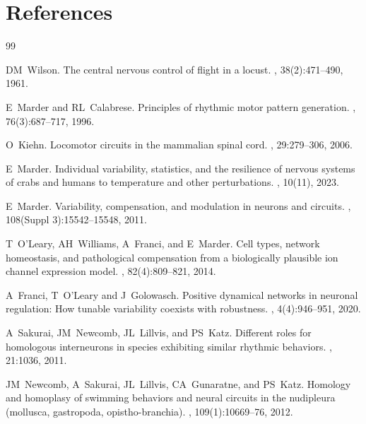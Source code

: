 \documentclass[nofootinbib,aip,amsmath,amssymb,reprint,twocolumn,10pt]{revtex4-2}
\begin{document}
\section*{References}

\begin{thebibliography}{99}

 
DM~Wilson.
\newblock The central nervous control of flight in a locust.
, 38(2):471--490, 1961.

E~Marder and RL~Calabrese.
\newblock Principles of rhythmic motor pattern generation.
, {76}({3}):687--717, {1996}.

O~Kiehn.
\newblock Locomotor circuits in the mammalian spinal cord.
, 29:279--306, 2006.

E~Marder.
\newblock Individual variability, statistics, and the resilience of nervous systems of crabs and humans to temperature and other perturbations.
, 10(11), 2023.

E~Marder.
\newblock Variability, compensation, and modulation in neurons and circuits.
, 108(Suppl 3):15542--15548, 2011.

T~O'Leary, AH~Williams, A~Franci, and E~Marder.
\newblock Cell types, network homeostasis, and pathological compensation from a biologically plausible ion channel expression model.
, 82(4):809--821, 2014.

A~Franci, T~O'Leary  and J~Golowasch.
\newblock Positive dynamical networks in neuronal regulation: How tunable variability coexists with robustness.
, 4(4):946--951, 2020.


A~Sakurai, JM~Newcomb, JL~Lillvis, and PS~Katz.
\newblock Different roles for homologous interneurons in species exhibiting
  similar rhythmic behaviors.
, 21:1036, 2011.

JM~Newcomb, A~Sakurai, JL~Lillvis, CA~Gunaratne, and PS~Katz.
\newblock Homology and homoplasy of swimming behaviors and neural circuits in
  the nudipleura (mollusca, gastropoda, 
  opistho-branchia).
, 109(1):10669--76, 2012.


\end{thebibliography}
\end{document}
